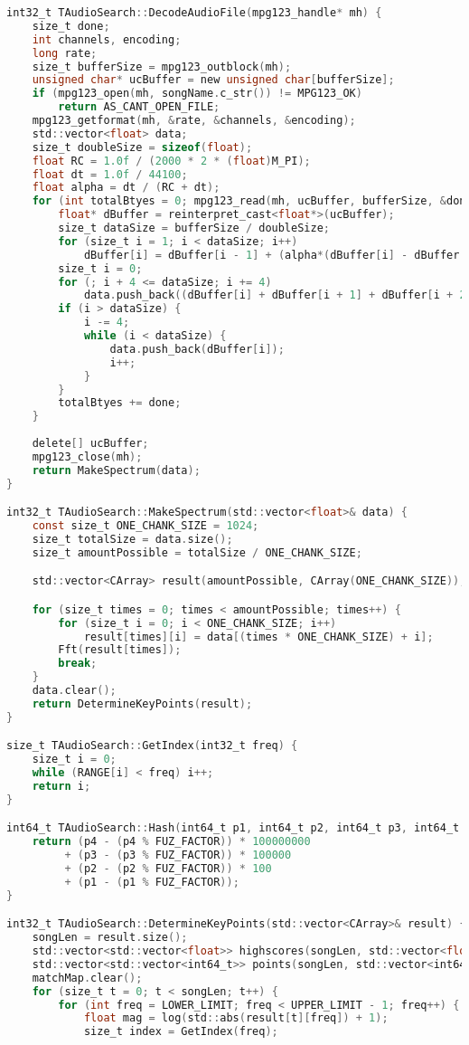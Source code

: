 \begin{lstlisting}[language=C, mathescape]
int32_t TAudioSearch::DecodeAudioFile(mpg123_handle* mh) {
    size_t done;
    int channels, encoding;
    long rate;
    size_t bufferSize = mpg123_outblock(mh);
    unsigned char* ucBuffer = new unsigned char[bufferSize];
    if (mpg123_open(mh, songName.c_str()) != MPG123_OK)
        return AS_CANT_OPEN_FILE;
    mpg123_getformat(mh, &rate, &channels, &encoding);
    std::vector<float> data;
    size_t doubleSize = sizeof(float);
    float RC = 1.0f / (2000 * 2 * (float)M_PI);
    float dt = 1.0f / 44100;
    float alpha = dt / (RC + dt);
    for (int totalBtyes = 0; mpg123_read(mh, ucBuffer, bufferSize, &done) == MPG123_OK; ) {
        float* dBuffer = reinterpret_cast<float*>(ucBuffer);
        size_t dataSize = bufferSize / doubleSize;
        for (size_t i = 1; i < dataSize; i++)
            dBuffer[i] = dBuffer[i - 1] + (alpha*(dBuffer[i] - dBuffer[i - 1]));
        size_t i = 0;
        for (; i + 4 <= dataSize; i += 4)
            data.push_back((dBuffer[i] + dBuffer[i + 1] + dBuffer[i + 2] + dBuffer[i + 3]) / 4);
        if (i > dataSize) {
            i -= 4;
            while (i < dataSize) {
                data.push_back(dBuffer[i]);
                i++;
            }
        }
        totalBtyes += done;
    }
   
    delete[] ucBuffer;
    mpg123_close(mh);
    return MakeSpectrum(data);
}

int32_t TAudioSearch::MakeSpectrum(std::vector<float>& data) {
    const size_t ONE_CHANK_SIZE = 1024;
    size_t totalSize = data.size();
    size_t amountPossible = totalSize / ONE_CHANK_SIZE;

    std::vector<CArray> result(amountPossible, CArray(ONE_CHANK_SIZE));

    for (size_t times = 0; times < amountPossible; times++) {
        for (size_t i = 0; i < ONE_CHANK_SIZE; i++) 
            result[times][i] = data[(times * ONE_CHANK_SIZE) + i];
        Fft(result[times]);
        break;
    }
    data.clear();
    return DetermineKeyPoints(result);
}

size_t TAudioSearch::GetIndex(int32_t freq) {
    size_t i = 0;
    while (RANGE[i] < freq) i++;
    return i;
}

int64_t TAudioSearch::Hash(int64_t p1, int64_t p2, int64_t p3, int64_t p4) {
    return (p4 - (p4 % FUZ_FACTOR)) * 100000000 
         + (p3 - (p3 % FUZ_FACTOR)) * 100000
         + (p2 - (p2 % FUZ_FACTOR)) * 100
         + (p1 - (p1 % FUZ_FACTOR));
}

int32_t TAudioSearch::DetermineKeyPoints(std::vector<CArray>& result) {
    songLen = result.size();
    std::vector<std::vector<float>> highscores(songLen, std::vector<float>(5, 0));
    std::vector<std::vector<int64_t>> points(songLen, std::vector<int64_t>(5, 0));
    matchMap.clear();
    for (size_t t = 0; t < songLen; t++) {
        for (int freq = LOWER_LIMIT; freq < UPPER_LIMIT - 1; freq++) {
            float mag = log(std::abs(result[t][freq]) + 1);
            size_t index = GetIndex(freq);


\end{lstlisting}
